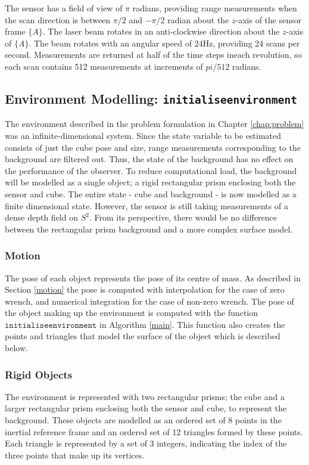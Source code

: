 The sensor has a field of view of $\pi$ radians, providing range measurements when the scan direction is between $\pi/2$ and $-\pi/2$ radian about the $z$-axis of the sensor frame $\{A\}$. The laser beam rotates in an anti-clockwise direction about the $z$-axis of $\{A\}$.
The beam rotates with an angular speed of $24$Hz, providing 24 scans per second. Measurements are returned at half of the time steps ineach revolution, so each scan contains 512 measurements at increments of $pi/512$ radians. 

\subsection{Environment Modelling: \texttt{initialiseenvironment}}
The environment described in the problem formulation in Chapter \ref{chap:problem} was an infinite-dimensional system. Since the state variable to be estimated consists of just the cube pose and size, range measurements corresponding to the background are filtered out. Thus, the state of the background has no effect on the performance of the observer. 
To reduce computational load, the background will be modelled as a single object; a rigid rectangular prism enclosing both the sensor and cube. 
The entire state - cube and background - is now modelled as a finite dimensional state. However, the sensor is still taking measurements of a dense depth field on $S^2$. From its perspective, there would be no difference between the rectangular prism background and a more complex surface model.

\subsubsection{Motion}
The pose of each object represents the pose of its centre of mass. As described in Section \ref{motion} the pose is computed with interpolation for the case of zero wrench, and numerical integration for the case of non-zero wrench. The pose of the object making up the environment is computed with the function $\texttt{initialiseenvironment}$ in Algorithm \ref{main}. This function also creates the points and triangles that model the surface of the object which is described below.

\subsubsection{Rigid Objects}
The environment is represented with two rectangular prisms; the cube and a larger rectangular prism enclosing both the sensor and cube, to represent the background. These objects are modelled as an ordered set of 8 points in the inertial reference frame and an ordered set of 12 triangles formed by these points. Each triangle is represented by a set of 3 integers, indicating the index of the three points that make up its vertices.

